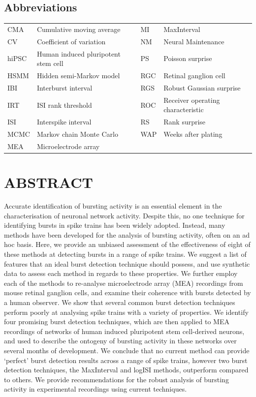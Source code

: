 \documentclass[12pt, titlepage]{article}
\begin{document}
	\subsection*{Abbreviations}
	\begin{tabular}{llll}
		\hline
		CMA & Cumulative moving average & MI & MaxInterval
		\\CV & Coefficient of variation & NM & Neural Maintenance 	
		\\hiPSC & Human induced pluripotent stem cell & PS &  Poisson surprise								 
		\\HSMM &  Hidden semi-Markov model \ \ \ &  RGC & Retinal ganglion cell
		\\ IBI &  Interburst interval& RGS & Robust Gaussian surprise
		\\IRT & ISI rank threshold & ROC & Receiver operating characteristic
		\\ ISI & Interspike interval & RS & Rank surprise
		\\ MCMC & Markov chain Monte Carlo &  WAP & Weeks after plating
		\\  MEA & Microelectrode array
		\\ \hline
	\end{tabular}

	\section*{ABSTRACT}
	Accurate identification of bursting activity is an essential element in the characterisation of neuronal network activity. Despite this, no one technique for identifying bursts in spike trains has been widely adopted. Instead, many methods have been developed for the analysis of bursting activity, often on an ad hoc basis. Here, we provide an unbiased assessment of the effectiveness of eight of these methods at detecting bursts in a range of spike trains. We suggest a list of features that an ideal burst detection technique should possess, and use synthetic data to assess each method in regards to these properties. We further employ each of the methods to re-analyse microelectrode array (MEA) recordings from mouse retinal ganglion cells, and examine their coherence with bursts detected by a human observer. We show that several common burst detection techniques perform poorly at analysing spike trains with a variety of properties. We identify four promising burst detection techniques, which are then applied to MEA recordings of networks of human induced pluripotent stem cell-derived neurons, and used to describe the ontogeny of bursting activity in these networks over several months of development. We conclude that no current method can provide `perfect' burst detection results across a range of spike trains, however two burst detection techniques, the MaxInterval and logISI methods, outperform compared to others. We provide recommendations for the robust analysis of bursting activity in experimental recordings using current techniques.
\end{document}
